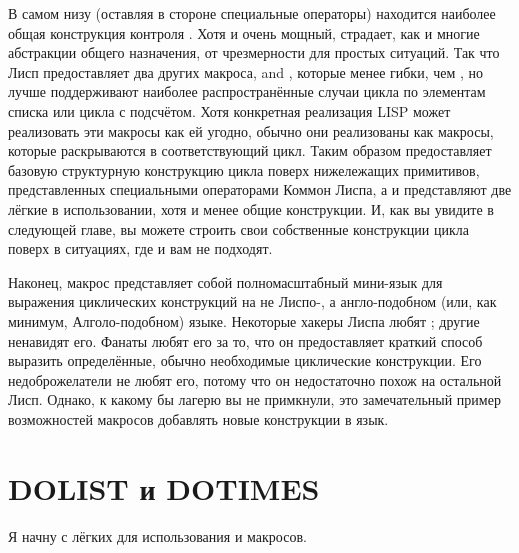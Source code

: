 В самом низу (оставляя в стороне специальные операторы) находится наиболее общая
конструкция контроля . Хотя и очень мощный,  страдает, как и многие
абстракции общего назначения, от чрезмерности для простых ситуаций. Так что Лисп
предоставляет два других макроса,  and , которые менее гибки,
чем , но лучше поддерживают наиболее распространённые случаи цикла по элементам
списка или цикла с подсчётом. Хотя конкретная реализация LISP может реализовать эти
макросы как ей угодно, обычно они реализованы как макросы, которые раскрываются в
соответствующий  цикл. Таким образом  предоставляет базовую структурную
конструкцию цикла поверх нижележащих примитивов, представленных специальными операторами
Коммон Лиспа, а  и  представляют две лёгкие в использовании,
хотя и менее общие конструкции. И, как вы увидите в следующей главе, вы можете строить
свои собственные конструкции цикла поверх  в ситуациях, где  и
 вам не подходят.

Наконец, макрос  представляет собой полномасштабный мини-язык для выражения
циклических конструкций на не Лиспо-, а англо-подобном (или, как минимум, Алголо-подобном)
языке. Некоторые хакеры Лиспа любят ; другие ненавидят его. Фанаты 
любят его за то, что он предоставляет краткий способ выразить определённые, обычно
необходимые циклические конструкции. Его недоброжелатели не любят его, потому что он
недостаточно похож на остальной Лисп. Однако, к какому бы лагерю вы не примкнули, это
замечательный пример возможностей макросов добавлять новые конструкции в язык.

\section{DOLIST и DOTIMES}

Я начну с лёгких для использования  и  макросов.


